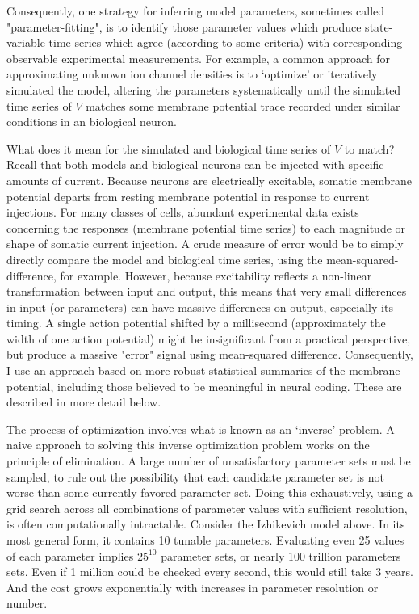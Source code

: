 Consequently, one strategy for inferring model parameters, sometimes called "parameter-fitting", is to identify those parameter values which produce state-variable time series which agree (according to some criteria) with corresponding observable experimental measurements.
For example, a common approach for approximating unknown ion channel densities is to ‘optimize’ or iteratively simulated the model, altering the parameters systematically until the simulated time series of $V$ matches some membrane potential trace recorded under similar conditions in an biological neuron.

What does it mean for the simulated and biological time series of $V$ to match?
Recall that both models and biological neurons can be injected with specific amounts of current. Because neurons are electrically excitable, somatic membrane potential departs from resting membrane potential in response to current injections.
For many classes of cells, abundant experimental data exists concerning the responses (membrane potential time series) to each magnitude or shape of somatic current injection.
A crude measure of error would be to simply directly compare the model and biological time series, using the mean-squared-difference, for example.
However, because excitability reflects a non-linear transformation between input and output, this means that very small differences in input (or parameters) can have massive differences on output, especially its timing.
A single action potential shifted by a millisecond (approximately the width of one action potential) might be insignificant from a practical perspective, but produce a massive "error" signal using mean-squared difference.
Consequently, I use an approach based on more robust statistical summaries of the membrane potential, including those believed to be meaningful in neural coding.
These are described in more detail below.

The process of optimization involves what is known as an ‘inverse’ problem.
A naive approach to solving this inverse optimization problem works on the principle of elimination.
A large number of unsatisfactory parameter sets must be sampled, to rule out the possibility that each candidate parameter set is not worse than some currently favored parameter set.
Doing this exhaustively, using a grid search across all combinations of parameter values with sufficient resolution, is often  computationally intractable.
Consider the Izhikevich model above.
In its most general form, it contains 10 tunable parameters.
Evaluating even 25 values of each parameter implies $25^10$ parameter sets, or nearly 100 trillion parameters sets.
Even if 1 million could be checked every second, this would still take 3 years.
And the cost grows exponentially with increases in parameter resolution or number.

